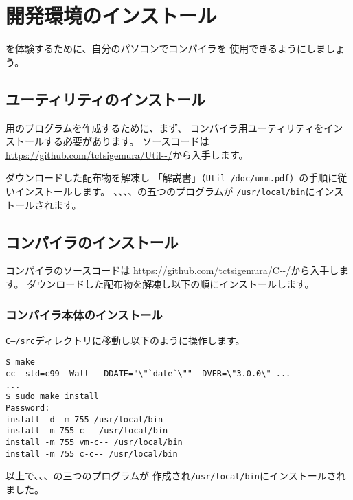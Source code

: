 % 
%
\chapter{\cmml 開発環境のインストール}

\cmml を体験するために、自分のパソコンで\cmm コンパイラを
使用できるようにしましょう。


\section{ユーティリティのインストール}

{\tac}用のプログラムを作成するために、まず、
{\cmm}コンパイラ用ユーティリティをインストールする必要があります。
ソースコードは
\url{https://github.com/tctsigemura/Util--/}から入手します。

ダウンロードした配布物を解凍し
「{\util}解説書」（{\tt Util--/doc/umm.pdf}）の手順に従いインストールします。
{\as}、{\ld}、{\objbin}、{\objexe}、{\size}の五つのプログラムが
{\tt /usr/local/bin}にインストールされます。

\section{コンパイラのインストール}

{\cmm}コンパイラのソースコードは
\url{https://github.com/tctsigemura/C--/}から入手します。
ダウンロードした配布物を解凍し以下の順にインストールします。

\subsection{コンパイラ本体のインストール}

{\tt C--/src}ディレクトリに移動し以下のように操作します。

\begin{mylist}
\begin{verbatim}
$ make
cc -std=c99 -Wall  -DDATE="\"`date`\"" -DVER=\"3.0.0\" ...
...
$ sudo make install
Password:
install -d -m 755 /usr/local/bin
install -m 755 c-- /usr/local/bin
install -m 755 vm-c-- /usr/local/bin
install -m 755 c-c-- /usr/local/bin
\end{verbatim}
\end{mylist}

以上で、{\cmmc}、{\vcmmc}、{\ccmmc}の三つのプログラムが
作成され\verb;/usr/local/bin;にインストールされました。

